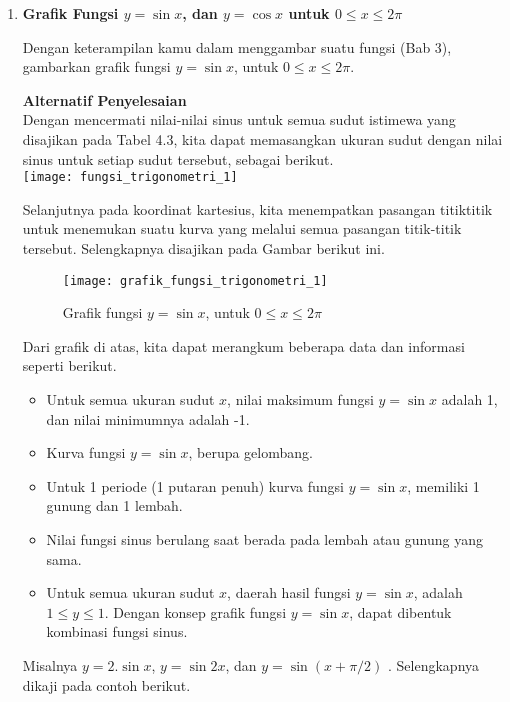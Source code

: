 \documentclass[11pt,fleqn]{book} %
\begin{document}
\begin{enumerate}
\item \textbf{Grafik Fungsi $y = \sin x$, dan $y = \cos x$ untuk $0 \leq x\leq 2\pi$}\\
\begin{problem}
Dengan keterampilan kamu dalam menggambar suatu fungsi (Bab 3), gambarkan grafik fungsi $y = \sin x$, untuk $0 \leq x\leq 2\pi$.\\
\end{problem}
\textbf{Alternatif Penyelesaian}\\
Dengan mencermati nilai-nilai sinus untuk semua sudut istimewa yang disajikan pada Tabel 4.3, kita dapat memasangkan ukuran sudut dengan nilai sinus untuk setiap sudut tersebut, sebagai berikut.\\

\texttt{[image: fungsi\_trigonometri\_1]}

Selanjutnya pada koordinat kartesius, kita menempatkan pasangan titiktitik untuk menemukan suatu kurva  yang melalui semua pasangan titik-titik tersebut. Selengkapnya disajikan pada Gambar berikut ini.\\

\begin{figure}[!ht]
\begin{center}
\texttt{[image: grafik\_fungsi\_trigonometri\_1]}
\caption{Grafik fungsi $y = \sin x$, untuk $0 \leq x\leq 2\pi$}
\end{center}
\end{figure}

Dari grafik di atas,  kita dapat merangkum beberapa data dan informasi seperti berikut.
\begin{itemize}
\item Untuk semua ukuran sudut $x$,  nilai maksimum fungsi $y = \sin x$ adalah 1, dan nilai minimumnya adalah -1.
\item Kurva fungsi $y = \sin x$, berupa gelombang.
\item Untuk 1 periode (1 putaran penuh) kurva fungsi $y = \sin x$, memiliki 1 gunung dan 1 lembah.
\item Nilai fungsi sinus berulang saat berada pada lembah atau gunung yang sama.
\item Untuk semua ukuran sudut $x$, daerah hasil fungsi $y = \sin x$, adalah $1 \leq y \leq 1$. Dengan konsep grafik fungsi $y = \sin x$, dapat dibentuk kombinasi fungsi sinus.
\end{itemize}

Misalnya $y = 2.\sin x$, $y = \sin 2x$, dan $y = \sin (x+\pi/2)$ . Selengkapnya dikaji pada contoh berikut.


\end{enumerate}
\end{document}
